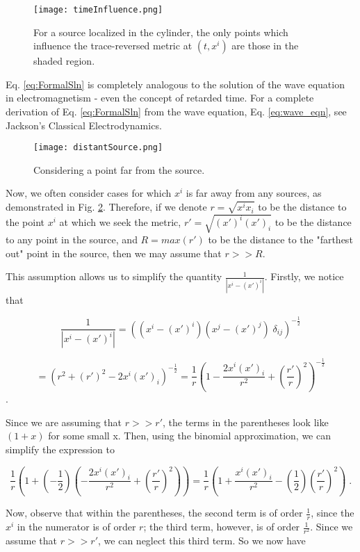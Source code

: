 \documentclass[10pt]{article}
\begin{document}
\begin{figure}[h]
\centering
\texttt{[image: timeInfluence.png]}
\caption{For a source localized in the cylinder, the only points which influence the trace-reversed metric at $(t,x^i)$ are those in the shaded region.}
\label{fig:timeInfluence}
\end{figure}
                
Eq. \ref{eq:FormalSln} is completely analogous to the solution of the wave equation in electromagnetism - even the concept of retarded time. For a complete derivation of Eq. \ref{eq:FormalSln} from the wave equation, Eq. \ref{eq:wave_eqn}, see Jackson's Classical Electrodynamics.
                
\begin{figure}[h]
\centering
\texttt{[image: distantSource.png]}
\caption{Considering a point far from the source.}
\label{fig:distantSource}
\end{figure}
                
Now, we often consider cases for which $x^i$ is far away from any sources, as demonstrated in Fig. \ref{fig:distantSource}. Therefore, if we denote $r = \sqrt{x^ix_i}$ to be the distance to the point $x^i$ at which we seek the metric, $r' = \sqrt{(x')^i(x')_i}$ to be the distance to any point in the source, and $R = max(r')$ to be the distance to the "farthest out" point in the source, then we may assume that $r >> R$.
                
This assumption allows us to simplify the quantity $\frac{1}{|x^i-(x')^i|}$. Firstly, we notice that
                
\[ \frac{1}{|x^i-(x')^i|} = ((x^i-(x')^i)(x^j-(x')^j) \; \delta_{ij})^{-\frac{1}{2}} \]
                
\[= (r^2 + (r')^2 - 2 x^i (x')_i)^{-\frac{1}{2}} = \frac{1}{r} \left( 1 - \frac{2 x^i (x')_i}{r^2} + \left( \frac{r'}{r}\right)^2 \right) ^{-\frac{1}{2}}\] \; .
                
Since we are assuming that $r >> r'$, the terms in the parentheses look like $(1 + x)$ for some small x. Then, using the binomial approximation, we can simplify the expression to 
                
\[ \frac{1}{r}\left( 1 + \left(-\frac{1}{2}\right) \left( - \frac{2 x^i (x')_i}{r^2} + \left( \frac{r'}{r}\right)^2 \right) \right) =   \frac{1}{r}\left( 1 + \frac{x^i (x')_i}{r^2} - \left( \frac{1}{2} \right) \left( \frac{r'}{r}\right)^2 \right) \; .\]
                
Now, observe that within the parentheses, the second term is of order $\frac{1}{r}$, since the $x^i$ in the numerator is of order $r$; the third term, however, is of order $\frac{1}{r^2}$. Since we assume that $r >> r'$, we can neglect this third term. So we now have
                
\end{document}
